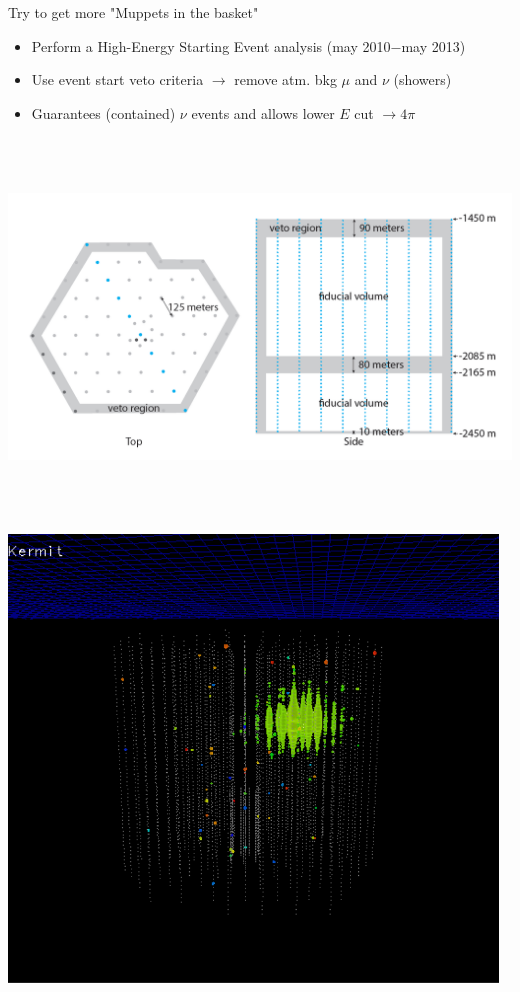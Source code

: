 \Tr
\onecolumn
\begin{center}
{\blue Try to get more "Muppets in the basket"}
\end{center}
%
\begin{itemize}
\item Perform a High-Energy Starting Event analysis (may 2010$-$may 2013)
\item[] Use event start veto criteria $\rightarrow$ remove atm. bkg $\mu$ and $\nu$ (showers)
\item[] Guarantees (contained) $\nu$ events and allows lower $E$ cut $\rightarrow 4\pi$
\end{itemize}
%
\begin{center}
\includegraphics[keepaspectratio,height=10cm]{veto}
\end{center}

\Tr
{}%
\begin{center}
\includegraphics[keepaspectratio,width=13cm]{kermit}
\end{center}

